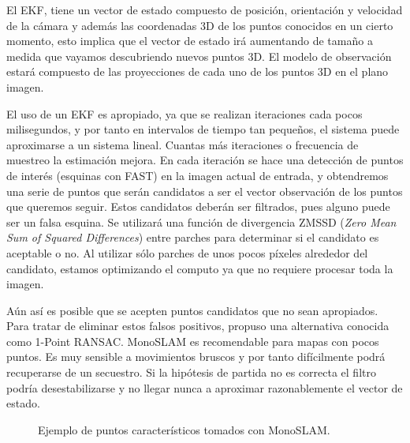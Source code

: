 El EKF, tiene un vector de estado compuesto de posición, orientación y velocidad de la cámara y además las coordenadas 3D de los puntos conocidos en un cierto momento, esto implica que el vector de estado irá aumentando de tamaño a medida que vayamos descubriendo nuevos puntos 3D. El modelo de observación estará compuesto de las proyecciones de cada uno de los puntos 3D en el plano imagen.

El uso de un EKF es apropiado, ya que se realizan iteraciones cada pocos milisegundos, y por tanto en intervalos de tiempo tan pequeños, el sistema puede aproximarse a un sistema lineal. Cuantas más iteraciones o frecuencia de muestreo la estimación mejora. En cada iteración se hace una detección de puntos de interés (esquinas con FAST) en la imagen actual de entrada, y obtendremos una serie de puntos que serán candidatos a ser el vector observación de los puntos que queremos seguir. Estos candidatos deberán ser filtrados, pues alguno puede ser un falsa esquina. Se utilizará una función de divergencia ZMSSD (\textit{Zero Mean Sum of Squared Differences}) entre parches para determinar si el candidato es aceptable o no. Al utilizar sólo parches de unos pocos píxeles alrededor del candidato, estamos optimizando el computo ya que no requiere procesar toda la imagen.

Aún así es posible que se acepten puntos candidatos que no sean apropiados. Para tratar de eliminar estos falsos positivos, \cite{civera20101} propuso una alternativa conocida como 1-Point RANSAC.
MonoSLAM es recomendable para mapas con pocos puntos. Es muy sensible a movimientos bruscos y por tanto difícilmente podrá recuperarse de un secuestro. Si la hipótesis de partida no es correcta el filtro podría desestabilizarse y no llegar nunca a aproximar razonablemente el vector de estado.


\begin{figure}[H]
\begin{center}
\end{center}
\caption{Ejemplo de puntos característicos tomados con MonoSLAM.}
\end{figure}
\clearpage


